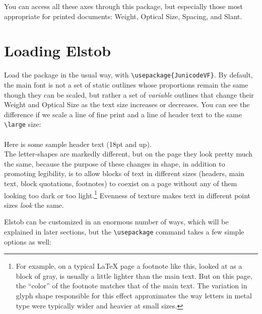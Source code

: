 \documentclass[12pt]{article}
\begin{document}
\noindent You can access all these axes through this package, but
especially those most appropriate for printed documents: Weight, Optical Size,
Spacing, and Slant.


\section{Loading Elstob}

Load the package in the usual way, with {\verb|\usepackage{JunicodeVF}|}.
By default, the main font is not a set of static outlines whose proportions
remain the same though they can be scaled, but rather a set of
\emph{variable} outlines that change their Weight and Optical Size as the text size increases
or decreases. You can see the difference if we scale a line of fine print
and a line of header text to the same {\verb|\large|} size:\\[0.5ex]

\\[0.2ex]
{\large\sampleheader Here is some sample header text (18pt and up).}\\[0.5ex]

\noindent The letter-shapes are markedly different, but on the page they look
pretty much the same, because the purpose of these changes in
shape, in addition to promoting legibility,
is to allow blocks of text in different sizes (headers, main text,
block quotations, footnotes) to coexist on a page without any of them looking too
dark or too light.\footnote{%
For example, on a typical LaTeX page a footnote like this, looked at as a block
of gray, is usually a little lighter than the main text. But on this page, the
“color” of the footnote matches that of the main text. The variation in glyph
shape responsible for this effect approximates the way letters in metal type were
typically wider and heavier at small sizes.} Evenness of texture makes text in
different point sizes \emph{look} the same.

Elstob can be customized in an enormous number of ways, which will be explained
in later sections, but the {\verb|\usepackage|} command takes a few simple options
as well:
\end{document}
